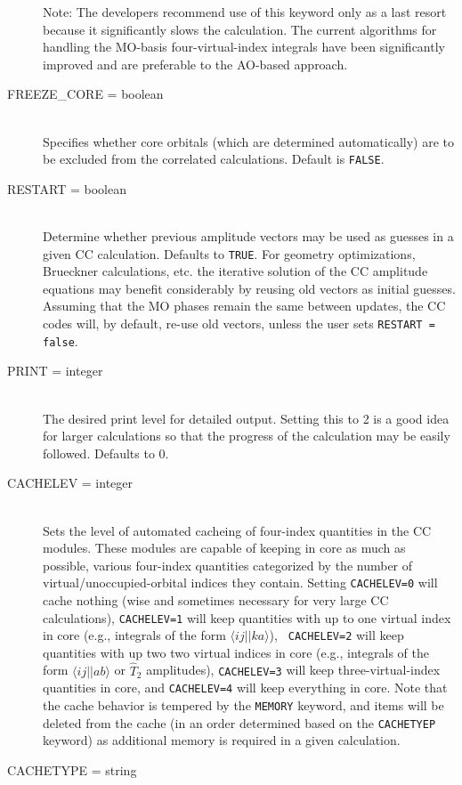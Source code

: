 \begin{description}
Note: The developers recommend use of this keyword only as a last resort
because it significantly slows the calculation. The current algorithms for
handling the MO-basis four-virtual-index integrals have been significantly
improved and are preferable to the AO-based approach.
\item[FREEZE\_CORE = boolean]\mbox{}\\
Specifies whether core orbitals (which are determined automatically) are to
be excluded from the correlated calculations.  Default is {\tt FALSE}.
\item[RESTART = boolean]\mbox{}\\ Determine whether previous amplitude
vectors may be used as guesses in a given CC calculation.  Defaults to
{\tt TRUE}. For geometry optimizations, Brueckner calculations, etc. the
iterative solution of the CC amplitude equations may benefit considerably
by reusing old vectors as initial guesses.  Assuming that the MO phases
remain the same between updates, the CC codes will, by default, re-use
old vectors, unless the user sets {\tt RESTART = false}.
\item[PRINT = integer]\mbox{}\\
The desired print level for detailed output.  Setting this to 2 is a good
idea for larger calculations so that the progress of the calculation may be
easily followed.  Defaults to 0.
\item[CACHELEV = integer]\mbox{}\\
Sets the level of automated cacheing of four-index quantities in the CC
modules.   These modules are capable of keeping in core as much as
possible, various four-index quantities categorized by the number of
virtual/unoccupied-orbital indices they contain.  Setting {\tt CACHELEV=0}
will cache nothing (wise and sometimes necessary for very large CC 
calculations), {\tt CACHELEV=1} will keep quantities with up to one virtual
index in core (e.g., integrals of the form $\langle ij||ka\rangle$), {\tt
CACHELEV=2} will keep quantities with up two two virtual indices in core
(e.g., integrals of the form $\langle ij||ab \rangle$ or $\hat{T}_2$
amplitudes), {\tt CACHELEV=3} will keep three-virtual-index quantities in
core, and {\tt CACHELEV=4} will keep everything in core.  Note that the
cache behavior is tempered by the {\tt MEMORY} keyword, and items will be
deleted from the cache (in an order determined based on the {\tt CACHETYEP}
keyword) as additional memory is required in a given calculation.
\item[CACHETYPE = string]\mbox{}\\

\end{description}
